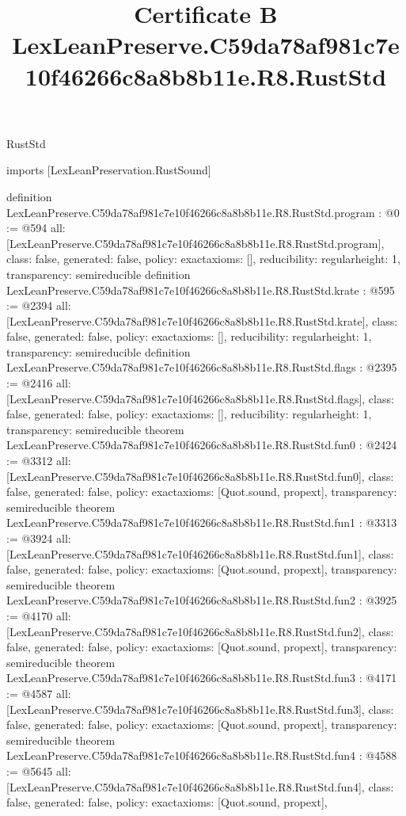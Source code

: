 \begin{lexlean}{RustStd}
\title{Certificate B LexLeanPreserve.C59da78af981c7e10f46266c8a8b8b11e.R8.RustStd}
\begin{coremodule}
imports [LexLeanPreservation.RustSound]

definition LexLeanPreserve.C59da78af981c7e10f46266c8a8b8b11e.R8.RustStd.program : @0 := @594 {
  all: [LexLeanPreserve.C59da78af981c7e10f46266c8a8b8b11e.R8.RustStd.program],
  class: false,
  generated: false,
  policy: exact{axioms: []},
  reducibility: regular{height: 1},
  transparency: semireducible
}
definition LexLeanPreserve.C59da78af981c7e10f46266c8a8b8b11e.R8.RustStd.krate : @595 := @2394 {
  all: [LexLeanPreserve.C59da78af981c7e10f46266c8a8b8b11e.R8.RustStd.krate],
  class: false,
  generated: false,
  policy: exact{axioms: []},
  reducibility: regular{height: 1},
  transparency: semireducible
}
definition LexLeanPreserve.C59da78af981c7e10f46266c8a8b8b11e.R8.RustStd.flags : @2395 := @2416 {
  all: [LexLeanPreserve.C59da78af981c7e10f46266c8a8b8b11e.R8.RustStd.flags],
  class: false,
  generated: false,
  policy: exact{axioms: []},
  reducibility: regular{height: 1},
  transparency: semireducible
}
theorem LexLeanPreserve.C59da78af981c7e10f46266c8a8b8b11e.R8.RustStd.fun0 : @2424 := @3312 {
  all: [LexLeanPreserve.C59da78af981c7e10f46266c8a8b8b11e.R8.RustStd.fun0],
  class: false,
  generated: false,
  policy: exact{axioms: [Quot.sound, propext]},
  transparency: semireducible
}
theorem LexLeanPreserve.C59da78af981c7e10f46266c8a8b8b11e.R8.RustStd.fun1 : @3313 := @3924 {
  all: [LexLeanPreserve.C59da78af981c7e10f46266c8a8b8b11e.R8.RustStd.fun1],
  class: false,
  generated: false,
  policy: exact{axioms: [Quot.sound, propext]},
  transparency: semireducible
}
theorem LexLeanPreserve.C59da78af981c7e10f46266c8a8b8b11e.R8.RustStd.fun2 : @3925 := @4170 {
  all: [LexLeanPreserve.C59da78af981c7e10f46266c8a8b8b11e.R8.RustStd.fun2],
  class: false,
  generated: false,
  policy: exact{axioms: [Quot.sound, propext]},
  transparency: semireducible
}
theorem LexLeanPreserve.C59da78af981c7e10f46266c8a8b8b11e.R8.RustStd.fun3 : @4171 := @4587 {
  all: [LexLeanPreserve.C59da78af981c7e10f46266c8a8b8b11e.R8.RustStd.fun3],
  class: false,
  generated: false,
  policy: exact{axioms: [Quot.sound, propext]},
  transparency: semireducible
}
theorem LexLeanPreserve.C59da78af981c7e10f46266c8a8b8b11e.R8.RustStd.fun4 : @4588 := @5645 {
  all: [LexLeanPreserve.C59da78af981c7e10f46266c8a8b8b11e.R8.RustStd.fun4],
  class: false,
  generated: false,
  policy: exact{axioms: [Quot.sound, propext]},
}
\end{coremodule}
\end{lexlean}

